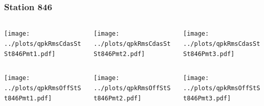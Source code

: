 \documentclass[aspectratio=169]{beamer}
\begin{document}
\begin{frame} 
  \frametitle{Station 846}
  \begin{center}
    \begin{columns}
      \begin{column}{0.33\textwidth}
        \texttt{[image: ../plots/qpkRmsCdasStSt846Pmt1.pdf]}
      \end{column}
      \begin{column}{0.33\textwidth}
        \texttt{[image: ../plots/qpkRmsCdasStSt846Pmt2.pdf]}
      \end{column}
      \begin{column}{0.33\textwidth}
        \texttt{[image: ../plots/qpkRmsCdasStSt846Pmt3.pdf]}
      \end{column}
    \end{columns}
  \end{center}

  \begin{center}
    \begin{columns}
      \begin{column}{0.33\textwidth}
        \texttt{[image: ../plots/qpkRmsOffStSt846Pmt1.pdf]}
      \end{column}
      \begin{column}{0.33\textwidth}
        \texttt{[image: ../plots/qpkRmsOffStSt846Pmt2.pdf]}
      \end{column}
      \begin{column}{0.33\textwidth}
        \texttt{[image: ../plots/qpkRmsOffStSt846Pmt3.pdf]}
      \end{column}
    \end{columns}
  \end{center}
\end{frame}
\end{document}
